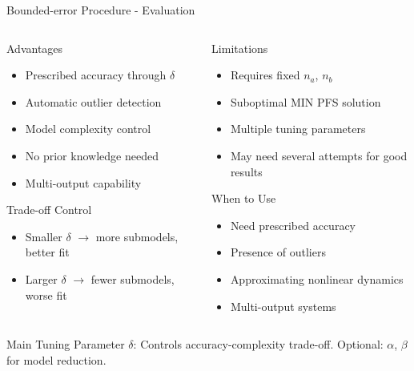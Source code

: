 \documentclass[aspectratio=169]{beamer}
\begin{document}
\begin{frame}{Bounded-error Procedure - Evaluation}
\begin{columns}[t]
\begin{column}{0.5\textwidth}
\begin{block}{Advantages}
\begin{itemize}
\item Prescribed accuracy through $\delta$
\item Automatic outlier detection
\item Model complexity control
\item No prior knowledge needed
\item Multi-output capability
\end{itemize}
\end{block}

\begin{exampleblock}{Trade-off Control}
\begin{itemize}
\item Smaller $\delta$ $\rightarrow$ more submodels, better fit
\item Larger $\delta$ $\rightarrow$ fewer submodels, worse fit
\end{itemize}
\end{exampleblock}
\end{column}
\begin{column}{0.5\textwidth}
\begin{block}{Limitations}
\begin{itemize}
\item Requires fixed $n_a$, $n_b$
\item Suboptimal MIN PFS solution
\item Multiple tuning parameters
\item May need several attempts for good results
\end{itemize}
\end{block}

\begin{alertblock}{When to Use}
\begin{itemize}
\item Need prescribed accuracy
\item Presence of outliers
\item Approximating nonlinear dynamics
\item Multi-output systems
\end{itemize}
\end{alertblock}
\end{column}
\end{columns}

\vspace{0.3cm}
\begin{block}{Main Tuning Parameter}
$\delta$: Controls accuracy-complexity trade-off. Optional: $\alpha$, $\beta$ for model reduction.
\end{block}
\end{frame}
\end{document}
